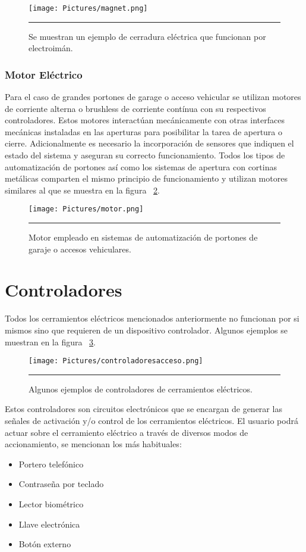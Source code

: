 \begin{figure}[htbp]
	\centering
	\texttt{[image: Pictures/magnet.png]}
	\rule{35em}{1pt}
	\caption[Cerradura Electroimán]{Se muestran un ejemplo de cerradura eléctrica que funcionan por electroimán. }
	\label{fig:cerr-mag}
\end{figure}

\subsubsection{Motor Eléctrico}
Para el caso de grandes portones de garage o acceso vehicular se utilizan motores de corriente alterna o brushless de corriente contínua con su respectivos controladores. Estos motores interactúan mecánicamente con otras interfaces mecánicas instaladas en las aperturas para posibilitar la tarea de apertura o cierre. Adicionalmente es necesario la incorporación de sensores que indiquen el estado del sistema y aseguran su correcto funcionamiento.
Todos los tipos de automatización de portones así como los sistemas de apertura con cortinas metálicas comparten el mismo principio de funcionamiento y utilizan motores similares al que se muestra en la figura ~\ref{fig:motorport}.

\begin{figure}[htbp]
	\centering
	\texttt{[image: Pictures/motor.png]}
	\rule{35em}{1pt}
	\caption[Motor Portones Automatizados]{Motor empleado en sistemas de automatización de portones de garaje o accesos vehiculares. }
	\label{fig:motorport}
\end{figure}

\section{Controladores}
\label{section:controladores}
Todos los cerramientos eléctricos mencionados anteriormente no funcionan por si mismos sino que requieren de un dispositivo controlador.
Algunos ejemplos se muestran en la figura ~\ref{fig:controladoresacceso}.\\
\begin{figure}[htbp]
	\centering
	\texttt{[image: Pictures/controladoresacceso.png]}
	\rule{35em}{1pt}
	\caption[Controladores de Acceso]{Algunos ejemplos de controladores de cerramientos eléctricos.}
	\label{fig:controladoresacceso}
\end{figure}
Estos controladores son circuitos electrónicos que se encargan de generar las señales de activación y/o control de los cerramientos eléctricos. El usuario podrá actuar sobre el cerramiento eléctrico a través de diversos modos de accionamiento, se mencionan los más habituales:
\begin{itemize}
	\item Portero telefónico
	\item Contraseña por teclado
	\item Lector biométrico
	\item Llave electrónica
	\item Botón externo
\end{itemize}

